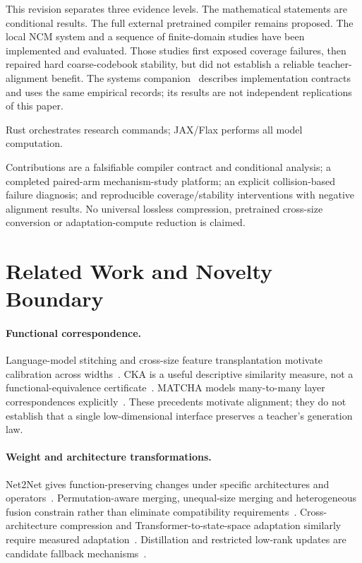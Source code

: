 \documentclass[11pt,a4paper]{article}
\begin{document}
This revision separates three evidence levels. The mathematical statements are
conditional results. The full external pretrained compiler remains proposed.
The local NCM system and a sequence of finite-domain studies have been
implemented and evaluated. Those studies first exposed coverage failures, then
repaired hard coarse-codebook stability, but did not establish a reliable
teacher-alignment benefit. The systems companion~\citep{systemscompanion}
describes implementation contracts and uses the same empirical records; its
results are not independent replications of this paper.

Rust orchestrates research commands; JAX/Flax performs all model computation.

Contributions are a falsifiable compiler contract and conditional analysis;
a completed paired-arm mechanism-study platform; an explicit collision-based
failure diagnosis; and reproducible coverage/stability interventions with
negative alignment results. No universal lossless compression, pretrained
cross-size conversion or adaptation-compute reduction is claimed.


\section{Related Work and Novelty Boundary}
\paragraph{Functional correspondence.}
Language-model stitching and cross-size feature transplantation motivate
calibration across widths~\citep{chen2025stitch}. CKA is a useful descriptive
similarity measure, not a functional-equivalence certificate~\citep{kornblith2019}.
MATCHA models many-to-many layer correspondences explicitly~\citep{sudakov2026}.
These precedents motivate alignment; they do not establish that a single
low-dimensional interface preserves a teacher's generation law.

\paragraph{Weight and architecture transformations.}
Net2Net gives function-preserving changes under specific architectures and
operators~\citep{chen2016net2net}. Permutation-aware merging, unequal-size merging
and heterogeneous fusion constrain rather than eliminate compatibility
requirements~\citep{ainsworth2022,soro2026,chen2026fusion}. Cross-architecture
compression and Transformer-to-state-space adaptation similarly require measured
adaptation~\citep{cui2026,wang2024mamba}. Distillation and restricted low-rank
updates are candidate fallback mechanisms~\citep{hinton2015,hu2022lora}.
\end{document}
